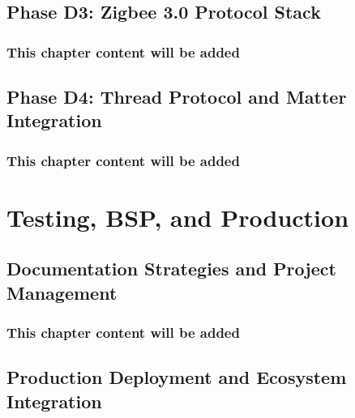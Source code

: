 \documentclass[11pt,a4paper,twoside,openright]{book}
\begin{document}


\chapter{Phase D3: Zigbee 3.0 Protocol Stack}
\label{ch:chapter-12}
\section*{This chapter content will be added}
\clearpage

\chapter{Phase D4: Thread Protocol and Matter Integration}
\label{ch:chapter-13}
\section*{This chapter content will be added}
\clearpage

\part{Testing, BSP, and Production}
\label{part:testing-bsp-production}





\chapter{Documentation Strategies and Project Management}
\label{ch:chapter-16}
\section*{This chapter content will be added}
\clearpage

\chapter{Production Deployment and Ecosystem Integration}
\label{ch:chapter-17}
\end{document}
